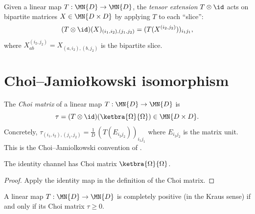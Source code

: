 \begin{definition}\label{def:tensor_map_id}
    \leanok
    Given a linear map $T : \MN{D} \to \MN{D}$,
    the \emph{tensor extension} $T \otimes \id$ acts on bipartite matrices
    $X \in \MN{D \times D}$ by applying $T$ to each ``slice'':
    \[
        (T \otimes \id)(X)_{(i_1,i_2),(j_1,j_2)}
        = (T(X^{(i_2,j_2)}))_{i_1 j_1},
    \]
    where $X^{(i_2,j_2)}_{ab} = X_{(a,i_2),(b,j_2)}$ is the
    bipartite slice.
\end{definition}

\section{Choi--Jamio\l{}kowski isomorphism}
\label{sec:choi_jamiolkowski}

\begin{definition}\label{def:choi_matrix}
    \leanok
    The \emph{Choi matrix} of a linear map
    $T : \MN{D} \to \MN{D}$ is
    \[
        \tau
        = (T \otimes \id)(\ketbra{\Omega}{\Omega})
        \in  \MN{D \times D}.
    \]
    Concretely,
    $\tau_{(i_1,i_2),(j_1,j_2)}
        = \frac{1}{D}\,(T(E_{i_2 j_2}))_{i_1 j_1}$
    where $E_{i_2 j_2}$ is the matrix unit.
    This is the Choi--Jamiol\-kowski convention of
    \cite[Proposition~2.1]{Wolf2012Quantum}.
\end{definition}

\begin{theorem}\label{thm:choi_matrix_id}
    \leanok
    The identity channel has Choi matrix
    $\ketbra{\Omega}{\Omega}$.
\end{theorem}

\begin{proof}\leanok
    Apply the identity map in the definition of the Choi matrix.
\end{proof}

\begin{theorem}\label{thm:cp_iff_choi_posSemidef}
    \leanok
    A linear map $T : \MN{D} \to \MN{D}$ is completely positive
    (in the Kraus sense) if and only if its Choi matrix $\tau \ge 0$.
\end{theorem}

